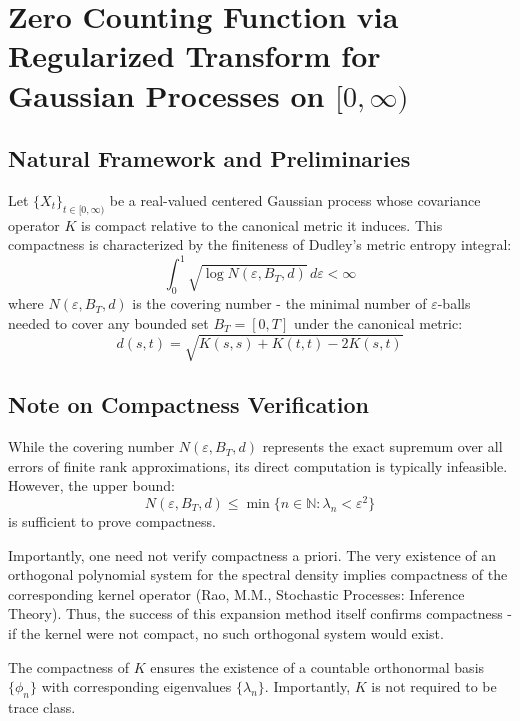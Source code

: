 \documentclass{article}
\begin{document}
\section{Zero Counting Function via Regularized Transform for Gaussian Processes on $[0,\infty)$}

\subsection{Natural Framework and Preliminaries}
Let $\{X_t\}_{t\in[0,\infty)}$ be a real-valued centered Gaussian process whose covariance operator $K$ is compact relative to the canonical metric it induces. This compactness is characterized by the finiteness of Dudley's metric entropy integral:
\begin{equation}
    \int_0^1 \sqrt{\log N(\varepsilon,B_T,d)} \, d\varepsilon < \infty
\end{equation}
where $N(\varepsilon,B_T,d)$ is the covering number - the minimal number of $\varepsilon$-balls needed to cover any bounded set $B_T = [0,T]$ under the canonical metric:
\begin{equation}
    d(s,t) = \sqrt{K(s,s) + K(t,t) - 2K(s,t)}
\end{equation}

\subsection{Note on Compactness Verification}
While the covering number $N(\varepsilon,B_T,d)$ represents the exact supremum over all errors of finite rank approximations, its direct computation is typically infeasible. However, the upper bound:
\begin{equation}
    N(\varepsilon,B_T,d) \leq \min\{n \in \mathbb{N} : \lambda_n < \varepsilon^2\}
\end{equation}
is sufficient to prove compactness. 

Importantly, one need not verify compactness a priori. The very existence of an orthogonal polynomial system for the spectral density implies compactness of the corresponding kernel operator (Rao, M.M., Stochastic Processes: Inference Theory). Thus, the success of this expansion method itself confirms compactness - if the kernel were not compact, no such orthogonal system would exist.

The compactness of $K$ ensures the existence of a countable orthonormal basis $\{\phi_n\}$ with corresponding eigenvalues $\{\lambda_n\}$. Importantly, $K$ is not required to be trace class.
\end{document}

